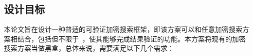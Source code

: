 

\subsection{设计目标}

本论文旨在设计一种普适的可验证加密搜索框架，即该方案可以和任意加密搜索方案相结合，包括但不限于~\cite{stefanov2014practical,cash2014dynamic,kamara2012dynamic}，使其能够完成结果验证的功能。本方案将现有的加密搜索方案当做黑盒，总体来说，需要满足以下几个需求：

